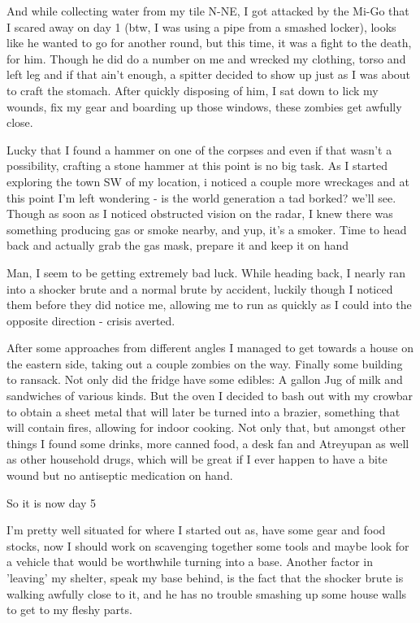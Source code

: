 And while collecting water from my tile N-NE, I got attacked by the Mi-Go that I scared away on day 1 (btw, I was using a pipe from a smashed locker), looks like he wanted to go for another round, but this time, it was a fight to the death, for him. Though he did do a number on me and wrecked my clothing, torso and left leg and if that ain't enough, a spitter decided to show up just as I was about to craft the stomach. After quickly disposing of him, I sat down to lick my wounds, fix my gear and boarding up those windows, these zombies get awfully close.

Lucky that I found a hammer on one of the corpses and even if that wasn't a possibility, crafting a stone hammer at this point is no big task. As I started exploring the town SW of my location, i noticed a couple more wreckages and at this point I'm left wondering - is the world generation a tad borked? we'll see. Though as soon as I noticed obstructed vision on the radar, I knew there was something producing gas or smoke nearby, and yup, it's a smoker. Time to head back and actually grab the gas mask, prepare it and keep it on hand

Man, I seem to be getting extremely bad luck. While heading back, I nearly ran into a shocker brute and a normal brute by accident, luckily though I noticed them before they did notice me, allowing me to run as quickly as I could into the opposite direction - crisis averted.

After some approaches from different angles I managed to get towards a house on the eastern side, taking out a couple zombies on the way. Finally some building to ransack. Not only did the fridge have some edibles: A gallon Jug of milk and sandwiches of various kinds. But the oven I decided to bash out with my crowbar to obtain a sheet metal that will later be turned into a brazier, something that will contain fires, allowing for indoor cooking. Not only that, but amongst other things I found some drinks, more canned food, a desk fan and Atreyupan as well as other household drugs, which will be great if I ever happen to have a bite wound but no antiseptic medication on hand.

So it is now day 5

I'm pretty well situated for where I started out as, have some gear and food stocks, now I should work on scavenging together some tools and maybe look for a vehicle that would be worthwhile turning into a base.
Another factor in 'leaving' my shelter, speak my base behind, is the fact that the shocker brute is walking awfully close to it, and he has no trouble smashing up some house walls to get to my fleshy parts.

